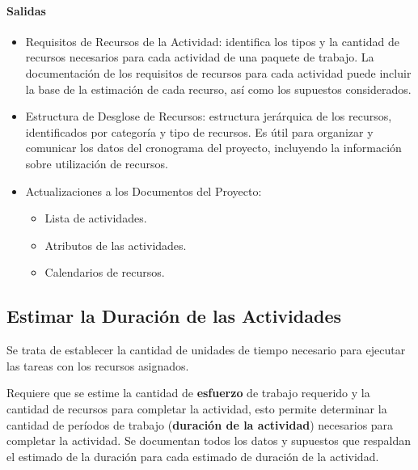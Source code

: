 \documentclass[a4paper,twosides]{article}
\newlength{\wideitemsep}
\let\olditem\item
\renewcommand{\item}{\setlength{\itemsep}{\wideitemsep}\olditem}
\begin{document}
\paragraph{Salidas}
\begin{itemize}
\item Requisitos de Recursos de la Actividad: identifica los tipos y la cantidad de recursos necesarios para cada actividad de una paquete de trabajo. La documentación de los requisitos de recursos para cada actividad puede incluir la base de la estimación de cada recurso, así como los supuestos considerados.
\item Estructura de Desglose de Recursos: estructura jerárquica de los recursos, identificados por categoría y tipo de recursos. Es útil para organizar y comunicar los datos del cronograma del proyecto, incluyendo la información sobre utilización de recursos.
\item Actualizaciones a los Documentos del Proyecto:
\begin{itemize}
\item Lista de actividades.
\item Atributos de las actividades.
\item Calendarios de recursos.
\end{itemize}
\end{itemize}

\subsection{Estimar la Duración de las Actividades} \label{sec:estimar_duracion_actividades}
Se trata de establecer la cantidad de unidades de tiempo necesario para ejecutar las tareas con los recursos asignados.
\par Requiere que se estime la cantidad de \textbf{esfuerzo} de trabajo requerido y la cantidad de recursos para completar la actividad, esto permite determinar la cantidad de períodos de trabajo (\textbf{duración de la actividad}) necesarios para completar la actividad. Se documentan todos los datos y supuestos que respaldan el estimado de la duración para cada estimado de duración de la actividad.
\end{document}
